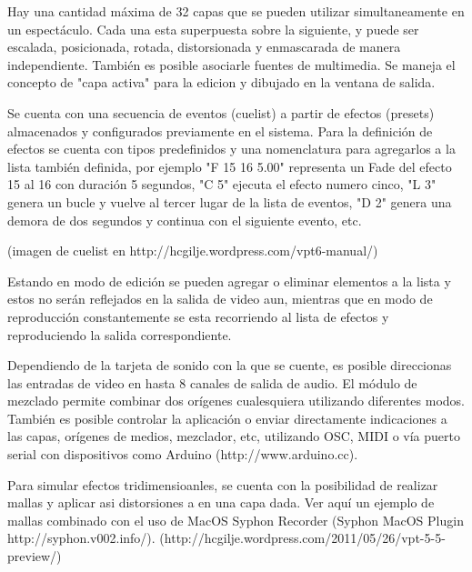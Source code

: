 Hay una cantidad máxima de 32 capas que se pueden utilizar simultaneamente en un espectáculo. Cada una esta superpuesta sobre la siguiente, y puede ser escalada, posicionada, rotada, distorsionada y enmascarada de manera independiente. También es posible asociarle fuentes de multimedia. Se maneja el concepto de "capa activa" para la edicion y dibujado en la ventana de salida.

Se cuenta con una secuencia de eventos (cuelist) a partir de efectos (presets) almacenados y configurados previamente en el sistema. Para la definición de efectos se cuenta con tipos predefinidos y una nomenclatura para agregarlos a la lista también definida, por ejemplo "F 15 16 5.00" representa un Fade del efecto 15 al 16 con duración 5 segundos, "C 5" ejecuta el efecto numero cinco, "L 3" genera un bucle y vuelve al tercer lugar de la lista de eventos, "D 2" genera una demora de dos segundos y continua con el siguiente evento, etc.

(imagen de cuelist en http://hcgilje.wordpress.com/vpt6-manual/)

Estando en modo de edición se pueden agregar o eliminar elementos a la lista y estos no serán reflejados en la salida de video aun, mientras que en modo de reproducción constantemente se esta recorriendo al lista de efectos y reproduciendo la salida correspondiente.

Dependiendo de la tarjeta de sonido con la que se cuente, es posible direccionas las entradas de video en hasta 8 canales de salida de audio. El módulo de mezclado permite combinar dos orígenes cualesquiera utilizando diferentes modos. También es posible controlar la aplicación o enviar directamente indicaciones a las capas, orígenes de medios, mezclador, etc, utilizando OSC, MIDI o vía puerto serial con dispositivos como Arduino (http://www.arduino.cc).

Para simular efectos tridimensioanles, se cuenta con la posibilidad de realizar mallas y aplicar asi distorsiones a en una capa dada. Ver aquí un ejemplo de mallas combinado con el uso de MacOS Syphon Recorder (Syphon MacOS Plugin http://syphon.v002.info/). (http://hcgilje.wordpress.com/2011/05/26/vpt-5-5-preview/)
